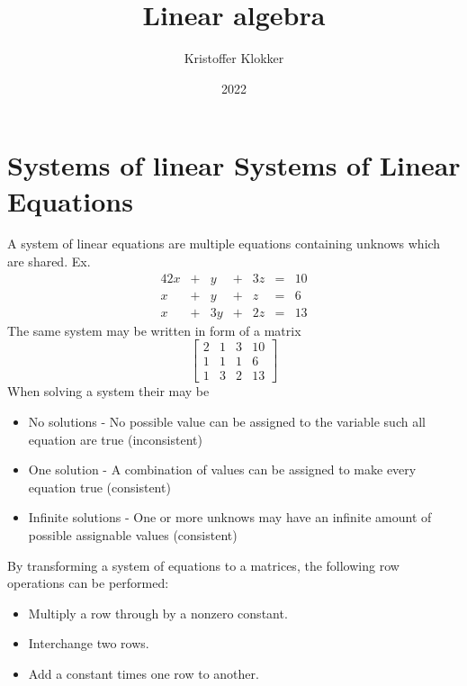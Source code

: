 \documentclass[12pt, a4paper]{article}
\title{Linear algebra}
\date{2022}
\author{Kristoffer Klokker}
\begin{document}
	\maketitle
	\clearpage
	\tableofcontents
	\clearpage
	\section{Systems of linear Systems of Linear Equations}
		A system of linear equations are multiple equations containing unknows which are shared. Ex.
		\begin{alignat*}{4}
		   2x & {}+{} &  y & {}+{} & 3z & {}={} & 10 \\
		    x & {}+{} &  y & {}+{} &  z & {}={} &  6 \\
		    x & {}+{} & 3y & {}+{} & 2z & {}={} & 13
		\end{alignat*}
		The same system may be written in form of a matrix\\
		$$\begin{bmatrix}
			2 & 1 & 3 & 10\\
			1 & 1 & 1 & 6\\
			1 & 3 & 2 & 13
		\end{bmatrix}$$
		When solving a system their may be
		\begin{itemize}
			\item No solutions - No possible value can be assigned to the variable such all equation are true (inconsistent)
			\item One solution - A combination of values can be assigned to make every equation true (consistent)
			\item Infinite solutions - One or more unknows may have an infinite amount of possible assignable values (consistent)
		\end{itemize}
		By transforming a system of equations to a matrices, the following row operations can be performed:
		\begin{itemize}
			\item Multiply a row through by a nonzero constant.
			\item Interchange two rows.
			\item Add a constant times one row to another.
		\end{itemize}
\end{document}
